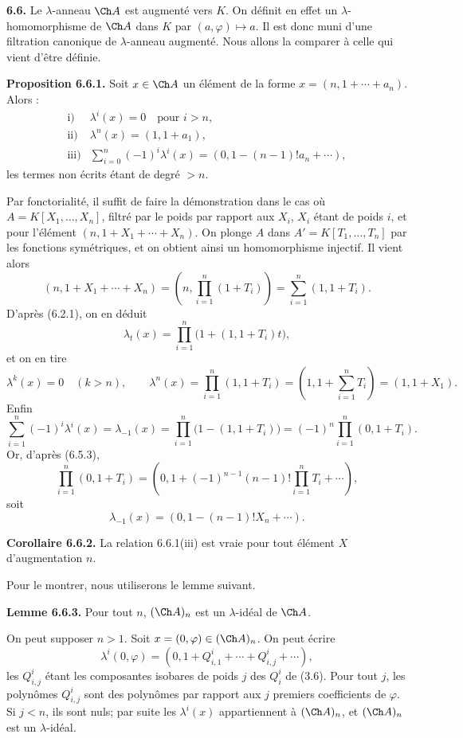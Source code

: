 \documentclass[11pt]{article}
\begin{document}
\textbf{6.6.} Le \(\lambda\)-anneau \(\Ch A\) est augmenté vers \(K\). On définit en effet un \(\lambda\)-homomorphisme de \(\Ch A\) dans \(K\) par \((a,\varphi)\mapsto a\). Il est donc muni d'une filtration canonique de \(\lambda\)-anneau augmenté. Nous allons la comparer à celle qui vient d'être définie.

\textbf{Proposition 6.6.1.} Soit \(x\in\Ch A\) un élément de la forme \(x=(n,1+\cdots+a_n)\). Alors :
\[
\begin{array}{ll}
\text{i)}& \lambda^i(x)=0\quad\text{pour }i>n,\\[0.3em]
\text{ii)}& \lambda^n(x)=(1,1+a_1),\\[0.3em]
\text{iii)}& \displaystyle\sum_{i=0}^n(-1)^i\lambda^i(x)
       =(0,1-(n-1)!a_n+\cdots),
\end{array}
\]
les termes non écrits étant de degré \(>n\).

Par fonctorialité, il suffit de faire la démonstration dans le cas où \(A=K[X_1,\ldots,X_n]\), filtré par le poids par rapport aux \(X_i\), \(X_i\) étant de poids \(i\), et pour l'élément \((n,1+X_1+\cdots+X_n)\). On plonge \(A\) dans \(A'=K[T_1,\ldots,T_n]\) par les fonctions symétriques, et on obtient ainsi un homomorphisme injectif. Il vient alors
\[
 (n,1+X_1+\cdots+X_n)
 =
 \left(n,\prod_{i=1}^n(1+T_i)\right)
 =
 \sum_{i=1}^n(1,1+T_i).
\]
D'après (6.2.1), on en déduit
\[
  \lambda_t(x)=\prod_{i=1}^n\bigl(1+(1,1+T_i)t\bigr),
\]
et on en tire
\[
  \lambda^k(x)=0\quad(k>n),\qquad
  \lambda^n(x)=\prod_{i=1}^n(1,1+T_i)
   =\left(1,1+\sum_{i=1}^nT_i\right)=(1,1+X_1).
\]
Enfin
\[
  \sum_{i=1}^n(-1)^i\lambda^i(x)=\lambda_{-1}(x)
  =
  \prod_{i=1}^n\bigl(1-(1,1+T_i)\bigr)
  =
  (-1)^n\prod_{i=1}^n(0,1+T_i).
\]
Or, d'après (6.5.3),
\[
  \prod_{i=1}^n(0,1+T_i)
  =
  \left(0,1+(-1)^{n-1}(n-1)!\prod_{i=1}^nT_i+\cdots\right),
\]
soit
\[
  \lambda_{-1}(x)=(0,1-(n-1)!X_n+\cdots).
\]

\textbf{Corollaire 6.6.2.} La relation 6.6.1(iii) est vraie pour tout élément \(X\) d'augmentation \(n\).

Pour le montrer, nous utiliserons le lemme suivant.

\textbf{Lemme 6.6.3.} Pour tout \(n\), \((\Ch A)_n\) est un \(\lambda\)-idéal de \(\Ch A\).

On peut supposer \(n>1\). Soit \(x=(0,\varphi)\in(\Ch A)_n\). On peut écrire
\[
  \lambda^i(0,\varphi)=(0,1+Q^i_{i,1}+\cdots+Q^i_{i,j}+\cdots),
\]
les \(Q^i_{i,j}\) étant les composantes isobares de poids \(j\) des \(Q^i_i\) de (3.6). Pour tout \(j\), les polynômes \(Q^i_{i,j}\) sont des polynômes par rapport aux \(j\) premiers coefficients de \(\varphi\). Si \(j<n\), ils sont nuls; par suite les \(\lambda^i(x)\) appartiennent à \((\Ch A)_n\), et \((\Ch A)_n\) est un \(\lambda\)-idéal.
\end{document}
